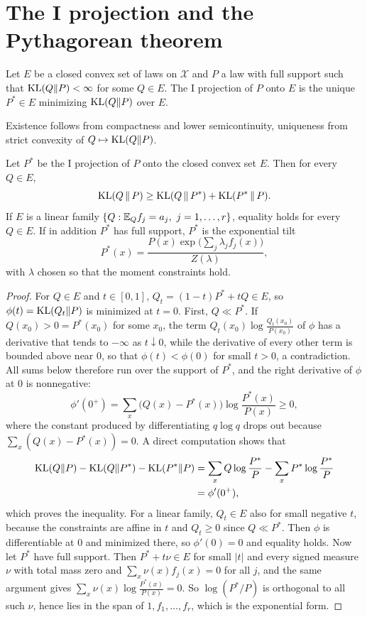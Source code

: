 \section{The I projection and the Pythagorean theorem}

\begin{definition}
Let $E$ be a closed convex set of laws on $\mathcal{X}$ and $P$ a law with full support such that $\mathrm{KL}(Q\|P)<\infty$ for some $Q\in E$. The I projection of $P$ onto $E$ is the unique $P^*\in E$ minimizing $\mathrm{KL}(Q\|P)$ over $E$.
\end{definition}

Existence follows from compactness and lower semicontinuity, uniqueness from strict convexity of $Q\mapsto\mathrm{KL}(Q\|P)$.

\begin{theorem}
\label{thm:pythagoras}
Let $P^*$ be the I projection of $P$ onto the closed convex set $E$. Then for every $Q\in E$,
\[
\mathrm{KL}(Q\,\|\,P)\geq\mathrm{KL}(Q\,\|\,P^*)+\mathrm{KL}(P^*\,\|\,P).
\]
If $E$ is a linear family $\{Q:\mathbb{E}_Qf_j = a_j,\ j = 1,\dots,r\}$, equality holds for every $Q\in E$. If in addition $P^*$ has full support, $P^*$ is the exponential tilt
\[
P^*(x) = \frac{P(x)\exp\big(\sum_j\lambda_jf_j(x)\big)}{Z(\lambda)},
\]
with $\lambda$ chosen so that the moment constraints hold.
\end{theorem}

\begin{proof}
For $Q\in E$ and $t\in[0,1]$, $Q_t = (1-t)P^*+tQ\in E$, so $\phi(t) = \mathrm{KL}(Q_t\|P)$ is minimized at $t = 0$. First, $Q\ll P^*$. If $Q(x_0)>0 = P^*(x_0)$ for some $x_0$, the term $Q_t(x_0)\log\frac{Q_t(x_0)}{P(x_0)}$ of $\phi$ has a derivative that tends to $-\infty$ as $t\downarrow0$, while the derivative of every other term is bounded above near $0$, so that $\phi(t)<\phi(0)$ for small $t>0$, a contradiction. All sums below therefore run over the support of $P^*$, and the right derivative of $\phi$ at $0$ is nonnegative:
\[
\phi'(0^+) = \sum_x\big(Q(x)-P^*(x)\big)\log\frac{P^*(x)}{P(x)}\geq0,
\]
where the constant produced by differentiating $q\log q$ drops out because $\sum_x(Q(x)-P^*(x)) = 0$. A direct computation shows that
\[
\begin{aligned}\mathrm{KL}(Q\|P)-\mathrm{KL}(Q\|P^*)-\mathrm{KL}(P^*\|P) &= \sum_xQ\log\frac{P^*}{P}-\sum_xP^*\log\frac{P^*}{P}\\ &= \phi'(0^+),\end{aligned}
\]
which proves the inequality. For a linear family, $Q_t\in E$ also for small negative $t$, because the constraints are affine in $t$ and $Q_t\geq0$ since $Q\ll P^*$. Then $\phi$ is differentiable at $0$ and minimized there, so $\phi'(0) = 0$ and equality holds. Now let $P^*$ have full support. Then $P^*+t\nu\in E$ for small $|t|$ and every signed measure $\nu$ with total mass zero and $\sum_x\nu(x)f_j(x) = 0$ for all $j$, and the same argument gives $\sum_x\nu(x)\log\frac{P^*(x)}{P(x)} = 0$. So $\log(P^*/P)$ is orthogonal to all such $\nu$, hence lies in the span of $1,f_1,\dots,f_r$, which is the exponential form.
\end{proof}

